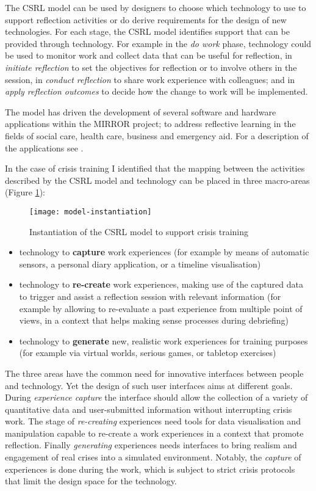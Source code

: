The CSRL model can be used by designers to choose which technology to use to support reflection activities or do derive requirements for the design of new technologies. For each stage, the CSRL model identifies support that can be provided through technology. For example in the \emph{do work} phase, technology could be used to monitor work and collect data that can be useful for reflection, in \emph{initiate reflection} to set the objectives for reflection or to involve others in the session, in \emph{conduct reflection} to share work experience with colleagues; and in \emph{apply reflection outcomes} to decide how the change to work will be implemented.

The model has driven the development of several software and hardware applications within the MIRROR project; to address reflective learning in the fields of social care, health care, business and emergency aid. For a description of the applications see \autocite{Schwantzer:2014we}. 

In the case of crisis training I identified that the mapping between the activities described by the CSRL model and technology can be placed in three macro-areas (Figure \ref{fig:model-instantiation}):

\begin{figure}
	[ptb] \centering 
	\texttt{[image: model-instantiation]} \caption{Instantiation of the CSRL model to support crisis training} \label{fig:model-instantiation} 
\end{figure}

\begin{itemize}
	\itemsep1pt\parskip0pt 
	\item technology to \textbf{capture} work experiences (for example by means of automatic sensors, a personal diary application, or a timeline visualisation) 
	\item technology to \textbf{re-create} work experiences, making use of the captured data to trigger and assist a reflection session with relevant information (for example by allowing to re-evaluate a past experience from multiple point of views, in a context that helps making sense processes during debriefing) 
	\item technology to \textbf{generate} new, realistic work experiences for training purposes (for example via virtual worlds, serious games, or tabletop exercises) 
\end{itemize}

The three areas have the common need for innovative interfaces between people and technology. Yet the design of such user interfaces aims at different goals. During \emph{experience capture} the interface should allow the collection of a variety of quantitative data and user-submitted information without interrupting crisis work. The stage of \emph{re-creating} experiences need tools for data visualisation and manipulation capable to re-create a work experiences in a context that promote reflection. Finally \emph{generating} experiences needs interfaces to bring realism and engagement of real crises into a simulated environment. Notably, the \emph{capture} of experiences is done during the work, which is subject to strict crisis protocols that limit the design space for the technology.

